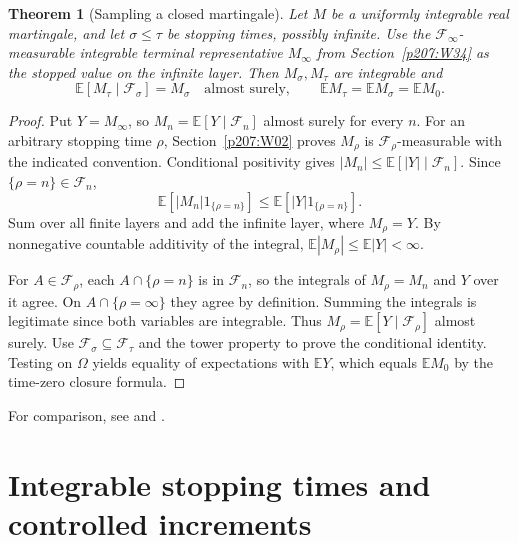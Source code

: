 \documentclass[11pt,oneside,openany]{book}
\theoremstyle{plain}
\newtheorem{theorem}{Theorem}[chapter]
\theoremstyle{definition}
\theoremstyle{remark}
\begin{document}
\begin{theorem}[Sampling a closed martingale]
Let \(M\) be a uniformly integrable real martingale, and let
\(\sigma\le\tau\) be stopping times, possibly infinite. Use
the \(\mathcal F_\infty\)-measurable integrable terminal
representative \(M_\infty\) from Section~\ref{p207:W34} as the
stopped value on the infinite layer. Then \(M_\sigma,M_\tau\)
are integrable and
\[
 \mathbb E[M_\tau\mid\mathcal F_\sigma]=M_\sigma
        \quad\text{almost surely},
 \qquad
 \mathbb E M_\tau=\mathbb E M_\sigma=\mathbb E M_0 .
\]
\end{theorem}
\begin{proof}
Put \(Y=M_\infty\), so \(M_n=\mathbb E[Y\mid\mathcal F_n]\)
almost surely for every \(n\). For an arbitrary stopping time
\(\rho\), Section~\ref{p207:W02} proves \(M_\rho\) is
\(\mathcal F_\rho\)-measurable with the indicated convention.
Conditional positivity gives \(|M_n|\le\mathbb E[|Y|\mid\mathcal F_n]\).
Since \(\{\rho=n\}\in\mathcal F_n\),
\[
 \mathbb E[|M_n|1_{\{\rho=n\}}]
       \le \mathbb E[|Y|1_{\{\rho=n\}}].
\]
Sum over all finite layers and add the infinite layer, where
\(M_\rho=Y\). By nonnegative countable additivity of the integral,
\(\mathbb E|M_\rho|\le\mathbb E|Y|<\infty\).

For \(A\in\mathcal F_\rho\), each \(A\cap\{\rho=n\}\) is in
\(\mathcal F_n\), so the integrals of \(M_\rho=M_n\) and \(Y\)
over it agree. On \(A\cap\{\rho=\infty\}\) they agree by
definition. Summing the integrals is legitimate since both
variables are integrable. Thus
\(M_\rho=\mathbb E[Y\mid\mathcal F_\rho]\) almost surely.
Use \(\mathcal F_\sigma\subseteq\mathcal F_\tau\) and the tower
property to prove the conditional identity. Testing on
\(\Omega\) yields equality of expectations with \(\mathbb E Y\),
which equals \(\mathbb E M_0\) by the time-zero closure formula.
\end{proof}

For comparison, see \cite[Appendix A14]{Williams}
and \cite[Sections 4.4 and 4.8]{Durrett}.

\section{Integrable stopping times and controlled increments}\label{p207:W42}
\end{document}
